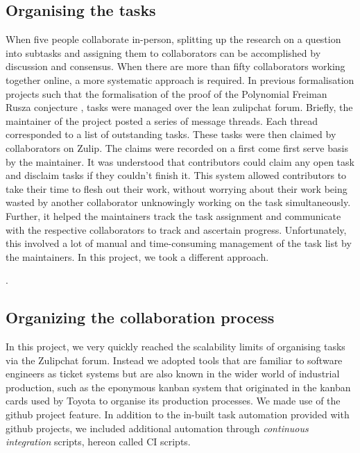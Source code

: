 \subsection{Organising the tasks}
When five people collaborate in-person, splitting up the research on a question into subtasks and assigning them to collaborators can be accomplished by discussion and consensus. When there are more than fifty collaborators working together online, a more systematic approach is required. In previous formalisation projects such that the formalisation of the proof of the Polynomial Freiman Rusza conjecture \cite{PFR_Tao_Dilles_2023}, tasks were managed over the lean zulipchat forum. Briefly, the maintainer of the project posted a series of message threads. Each thread corresponded to a list of outstanding tasks. These tasks were then claimed by collaborators on Zulip. The claims were recorded on a first come first serve basis by the maintainer. It was understood that contributors could claim any open task and disclaim tasks if they couldn't finish it. This system allowed contributors to take their time to flesh out their work, without worrying about their work being wasted by another collaborator unknowingly working on the task simultaneously. Further, it helped the maintainers track the task assignment and communicate with the respective collaborators to track and ascertain progress. Unfortunately, this involved a lot of manual and time-consuming management of the task list by the maintainers. In this project, we took a different approach.

.

\subsection{Organizing the collaboration process}
In this project, we very quickly reached the scalability limits of organising tasks via the Zulipchat forum. Instead we adopted tools that are familiar to software engineers as ticket systems but are also known in the wider world of industrial production, such as the eponymous kanban system that originated in the kanban cards used by Toyota to organise its production processes. We made use of the github project feature. In addition to the in-built task automation provided with github projects, we included additional automation through \emph{continuous integration} scripts, hereon called CI scripts.

